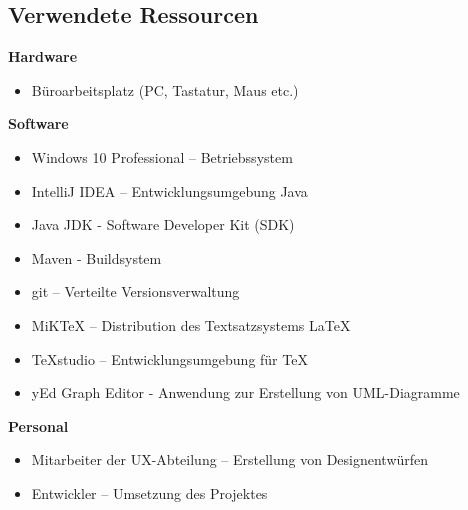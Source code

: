 \subsection{Verwendete Ressourcen}
\label{ressources}

\textbf{Hardware}

\begin{itemize}
\item Büroarbeitsplatz (PC, Tastatur, Maus etc.)
\end{itemize}
 
\textbf{Software}

\begin{itemize}
\item Windows 10 Professional – Betriebssystem
\item IntelliJ IDEA – Entwicklungsumgebung Java
\item Java JDK - Software Developer Kit (SDK)
\item Maven - Buildsystem
\item git – Verteilte Versionsverwaltung
\item MiKTeX – Distribution des Textsatzsystems \LaTeX
\item TeXstudio – Entwicklungsumgebung für \TeX
\item yEd Graph Editor - Anwendung zur Erstellung von UML-Diagramme
\end{itemize}

\textbf{Personal}

\begin{itemize}
\item Mitarbeiter der UX-Abteilung – Erstellung von Designentwürfen
\item Entwickler – Umsetzung des Projektes
\end{itemize}

\vfill